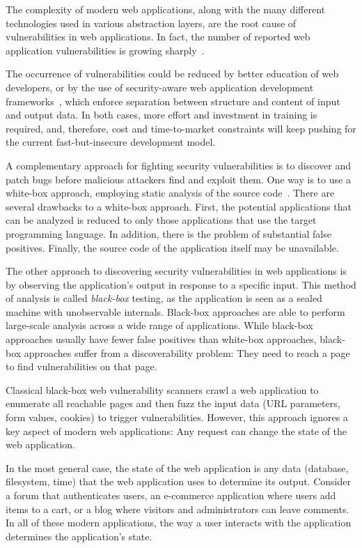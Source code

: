The complexity of modern web applications, along with the many different
technologies used in various abstraction layers, are the root cause of
vulnerabilities in web applications. In fact, the number of reported web
application vulnerabilities is growing sharply~\cite{steve07,
  fossi09:symantec}.

The occurrence of vulnerabilities could be reduced by better education of web
developers, or by the use of security-aware web application development
frameworks~\cite{robertson09, chong07}, which enforce separation between
structure and content of input and output data. In both cases, more effort and
investment in training is required, and, therefore, cost and time-to-market
constraints will keep pushing for the current fast-but-insecure development
model.

A complementary approach for fighting security vulnerabilities is to discover and
patch bugs before malicious attackers find and exploit them. One way is to use
a white-box approach, employing static analysis of the source
code~\cite{felmetsger10:logic,huang03:web,jovanovic10:static,balzarotti08:saner}.
There are several drawbacks to a white-box approach. First, the potential
applications that can be analyzed is reduced to only those applications that
use the target programming language. In addition, there is the problem of
substantial false positives. Finally, the source code of the
application itself may be unavailable.

The other approach to discovering security vulnerabilities in web applications
is by observing the application's output in response to a specific input. This
method of analysis is called \emph{black-box} testing, as the application is
seen as a sealed machine with unobservable internals. Black-box approaches are
able to perform large-scale analysis across a wide range of applications. While
black-box approaches usually have fewer false positives than white-box
approaches, black-box approaches suffer from a discoverability problem: They
need to reach a page to find vulnerabilities on that page.

Classical black-box web vulnerability scanners crawl a web application to
enumerate all reachable pages and then fuzz the input data (URL parameters,
form values, cookies) to trigger vulnerabilities. However, this approach
ignores a key aspect of modern web applications: Any request can change the state of the web application.

In the most general case, the state of the web application is any data
(database, filesystem, time) that the web application uses to determine
its output. Consider a forum that authenticates users, an e-commerce
application where users add items to a cart, or a blog where visitors and
administrators can leave comments. In all of these modern applications, the way
a user interacts with the application determines the application's state.

